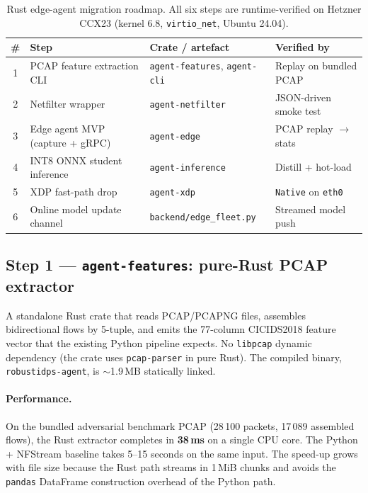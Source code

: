 \documentclass[11pt,a4paper]{article}
\begin{document}
\begin{table}[H]
\centering
\caption{Rust edge-agent migration roadmap. All six steps are
  runtime-verified on Hetzner CCX23 (kernel 6.8, \texttt{virtio\_net},
  Ubuntu 24.04).}
\label{tab:rust_roadmap}
\small
\begin{tabular}{@{}clll@{}}
\toprule
\textbf{\#} & \textbf{Step} & \textbf{Crate / artefact} & \textbf{Verified by} \\
\midrule
1 & PCAP feature extraction CLI            & \texttt{agent-features}, \texttt{agent-cli} & Replay on bundled PCAP \\
2 & Netfilter wrapper                       & \texttt{agent-netfilter}                  & JSON-driven smoke test \\
3 & Edge agent MVP (capture + gRPC)         & \texttt{agent-edge}                       & PCAP replay $\to$ stats \\
4 & INT8 ONNX student inference             & \texttt{agent-inference}                  & Distill + hot-load \\
5 & XDP fast-path drop                      & \texttt{agent-xdp}                        & \texttt{Native} on \texttt{eth0} \\
6 & Online model update channel             & \texttt{backend/edge\_fleet.py}           & Streamed model push \\
\bottomrule
\end{tabular}
\end{table}

\subsection{Step 1 --- \texttt{agent-features}: pure-Rust PCAP extractor}

A standalone Rust crate that reads PCAP/PCAPNG files, assembles
bidirectional flows by 5-tuple, and emits the 77-column CICIDS2018
feature vector that the existing Python pipeline expects.  No
\texttt{libpcap} dynamic dependency (the crate uses \texttt{pcap-parser}
in pure Rust).  The compiled binary, \texttt{robustidps-agent}, is
$\sim$1.9\,MB statically linked.

\paragraph{Performance.}
On the bundled adversarial benchmark PCAP (28\,100 packets,
17\,089 assembled flows), the Rust extractor completes in
\textbf{38\,ms} on a single CPU core.  The Python + NFStream baseline
takes 5--15 seconds on the same input.  The speed-up grows with file
size because the Rust path streams in 1\,MiB chunks and avoids the
\texttt{pandas} DataFrame construction overhead of the Python path.
\end{document}
